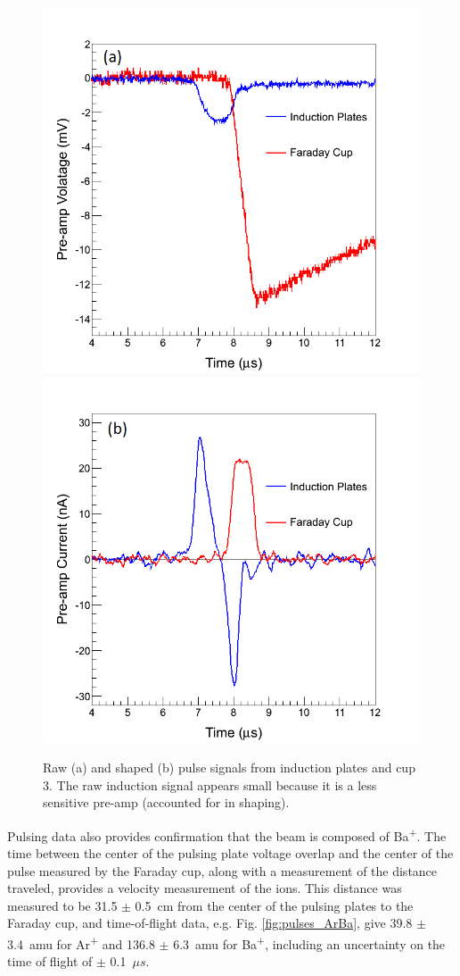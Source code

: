 \begin{figure} %
                \includegraphics[width=.49\textwidth]{figures/pulse_ind_cup3_raw.png}
                \includegraphics[width=.49\textwidth]{figures/pulse_ind_cup3_shaped.png}
                \caption{Raw (a) and shaped (b) pulse signals from induction plates and cup 3.  The raw induction signal appears small because it is a less sensitive pre-amp (accounted for in shaping).}
        \label{fig:pulse_raw_shaped}
\end{figure}

Pulsing data also provides confirmation that the beam is composed of Ba\textsuperscript{+}.  The time between the center of the pulsing plate voltage overlap and the center of the pulse measured by the Faraday cup, along with a measurement of the distance traveled, provides a velocity measurement of the ions.  This distance was measured to be 31.5 $\pm$ 0.5~cm from the center of the pulsing plates to the Faraday cup, and time-of-flight data, e.g. Fig. \ref{fig:pulses_ArBa}, give 39.8 $\pm$ 3.4~amu for Ar\textsuperscript{+} and 136.8 $\pm$ 6.3~amu for Ba\textsuperscript{+}, including an uncertainty on the time of flight of $\pm$ 0.1~$\mu s$.

